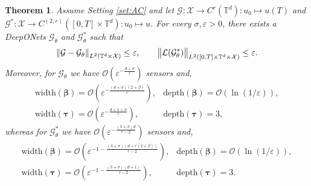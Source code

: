 \documentclass{article}
\numberwithin{equation}{section}
\newcommand{\width}{\mathrm{width}}
\newcommand{\depth}{\mathrm{depth}}
\newcommand{\T}{\mathbb{T}}
\newcommand{\cG}{\mathcal{G}}
\newcommand{\cL}{\mathcal{L}}
\newcommand{\cX}{\mathcal{X}}
\newcommand{\trunk}{{\bm{\tau}}}
\newcommand{\branch}{{\bm{\beta}}}
\renewcommand{\epsilon}{\varepsilon}
\newcommand{\1}{\mathbbm{1}}
\newcommand{\bigO}{\mathcal{O}}
\newtheorem{theorem}{Theorem}[section]
\begin{document}

\begin{theorem}\label{thm:AC-operator}
Assume Setting \ref{set:AC} and let $\cG: \cX\to C^{r}(\T^d):u_0\mapsto u(T)$ and $\cG^*: \cX \to C^{(2,r)}([0,T]\times \T^d):u_0\mapsto u$. For every $\sigma, \epsilon>0$, there exists a DeepONets $\cG_\theta$ and $\cG_\theta^*$ such that
\begin{equation}
    \norm{\cG-\cG_\theta}_{L^2(\T^d\times \cX)} \leq \epsilon, \qquad \norm{\cL(\cG^*_\theta)}_{L^2([0,T]\times\T^d\times \cX)} \leq \epsilon. 
\end{equation}
Moreover, for $\cG_\theta$ we have $\bigO(\epsilon^{-\frac{d+\sigma}{r}})$ sensors and,
\begin{equation}
    \begin{array}{ll}
    \width(\branch)= \bigO( \epsilon^{-\frac{(d+\sigma)(2+\beta)}{r}}), & \depth(\branch) =\bigO( \ln(1/\epsilon)), \\ 
    \width(\trunk) = \bigO(\epsilon^{-\frac{d+1+\sigma}{r}}), & \depth(\trunk) = 3,
    \end{array}
\end{equation}
whereas for $\cG^*_\theta$ we have $\bigO(\epsilon^{-\frac{(3+\sigma)d}{r-2}})$ sensors and,
\begin{equation}
    \begin{array}{ll}
    \width(\branch)= \bigO( \epsilon^{-1-\frac{(3+\sigma)(d+r(2+\beta))}{r-2}}), & \depth(\branch) =\bigO( \ln(1/\epsilon)), \\ 
    \width(\trunk) = \bigO(\epsilon^{-1-\frac{(3+\sigma)(d+1)}{r-2}}), & \depth(\trunk) = 3.
    \end{array}
\end{equation}

\end{theorem}
\end{document}
